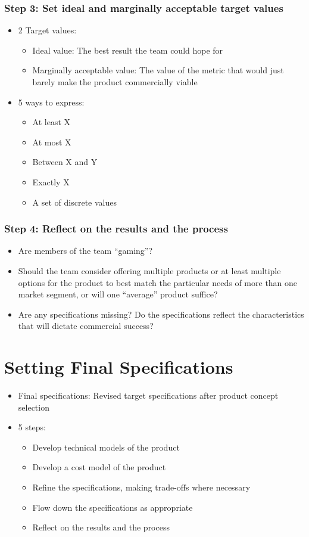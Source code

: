\documentclass[a4paper,12pt,openany]{book}
\begin{document}
\subsubsection{Step 3: Set ideal and marginally acceptable target values}
\begin{itemize}
    \item 2 Target values:
    \begin{itemize}
        \item Ideal value: The best result the team could hope for
        \item Marginally acceptable value: The value of the metric that would just barely make the product commercially viable
    \end{itemize}
    \item 5 ways to express:
    \begin{itemize}
        \item At least X
        \item At most X
        \item Between X and Y
        \item Exactly X
        \item A set of discrete values
    \end{itemize}
\end{itemize}
\subsubsection{Step 4: Reflect on the results and the process}
\begin{itemize}
    \item Are members of the team ``gaming''?
    \item Should the team consider offering multiple products or at least multiple options for the product to best match the particular needs of more than one market segment, or will one ``average'' product suffice?
    \item Are any specifications missing? Do the specifications reflect the characteristics that will dictate commercial success?
\end{itemize}

\section{Setting Final Specifications}
\begin{itemize}
    \item Final specifications: Revised target specifications after product concept selection
    \item 5 steps:
    \begin{itemize}
        \item Develop technical models of the product
        \item Develop a cost model of the product
        \item Refine the specifications, making trade-offs where necessary
        \item Flow down the specifications as appropriate
        \item Reflect on the results and the process
    \end{itemize}
\end{itemize}
\end{document}
